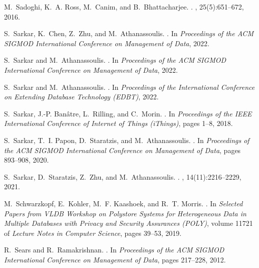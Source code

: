 \documentclass[11pt,dvipdfmx]{article}
\begin{document}
\begin{thebibliography}{10}
\begin{small}
  M.~Sadoghi, K.~A. Ross, M.~Canim, and B.~Bhattacharjee.
  .
  , 25(5):651--672, 2016.
  
  S.~Sarkar, K.~Chen, Z.~Zhu, and M.~Athanassoulis.
  .
  \newblock In {\em Proceedings of the ACM SIGMOD International Conference on
    Management of Data}, 2022.
  
  S.~Sarkar and M.~Athanassoulis.
  .
  \newblock In {\em Proceedings of the ACM SIGMOD International Conference on
    Management of Data}, 2022.
  
  S.~Sarkar and M.~Athanassoulis.
  .
  \newblock In {\em Proceedings of the International Conference on Extending
    Database Technology (EDBT)}, 2022.
  
  S.~Sarkar, J.-P. Ban{\^{a}}tre, L.~Rilling, and C.~Morin.
  .
  \newblock In {\em Proceedings of the IEEE International Conference of Internet
    of Things (iThings)}, pages 1--8, 2018.
  
  S.~Sarkar, T.~I. Papon, D.~Staratzis, and M.~Athanassoulis.
  .
  \newblock In {\em Proceedings of the ACM SIGMOD International Conference on
    Management of Data}, pages 893--908, 2020.
  
  S.~Sarkar, D.~Staratzis, Z.~Zhu, and M.~Athanassoulis.
  .
  , 14(11):2216--2229, 2021.
  
  M.~Schwarzkopf, E.~Kohler, M.~F. Kaashoek, and R.~T. Morris.
  .
  \newblock In {\em Selected Papers from VLDB Workshop on Polystore Systems for
    Heterogeneous Data in Multiple Databases with Privacy and Security Assurances
    (POLY)}, volume 11721 of {\em Lecture Notes in Computer Science}, pages
    39--53, 2019.
  
  R.~Sears and R.~Ramakrishnan.
  .
  \newblock In {\em Proceedings of the ACM SIGMOD International Conference on
    Management of Data}, pages 217--228, 2012.
  

\end{small}
\end{thebibliography}
\end{document}
